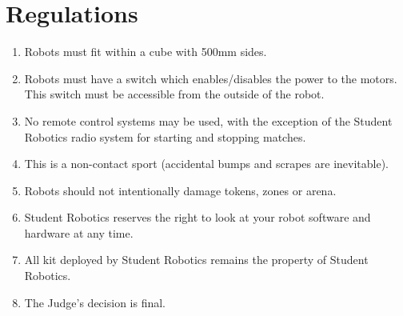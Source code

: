 \section {Regulations}
\label{regs}

\begin{enumerate}
\item Robots must fit within a cube with 500mm sides.
\item Robots must have a switch which enables/disables the power to the motors.  This switch must be accessible from the outside of the robot.
\item No remote control systems may be used, with the exception of the Student Robotics radio system for starting and stopping matches.
\item This is a non-contact sport (accidental bumps and scrapes are inevitable).
\item Robots should not intentionally damage tokens, zones or arena.
\item Student Robotics reserves the right to look at your robot software and hardware at any time.
\item All kit deployed by Student Robotics remains the property of Student Robotics.
\item The Judge's decision is final.
\end{enumerate}
